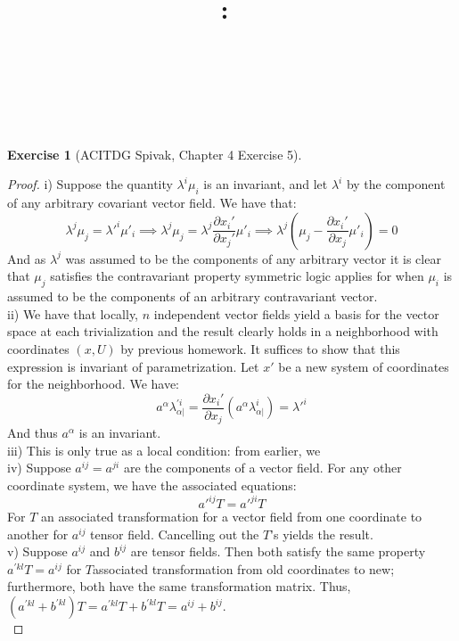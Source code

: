 \documentclass{article}
\title{
    \vspace{2in}
    \textmd{\textbf{\hmwkClass:\ \hmwkTitle}}\\
    \vspace{0.1in}
    \textmd{\hmwkDueDate} \\
    \vspace{0.2in}\large{\textit{\hmwkClassInstructor\  }}
    \vspace{2in}
}
\author{\hmwkAuthorName}
\date{}
\newtheorem{exercise}{Exercise}
\begin{document}
\maketitle

\newpage

\begin{exercise}[ACITDG Spivak, Chapter 4 Exercise 5]  
\end{exercise}
\begin{proof}
  i) Suppose the quantity $\lambda^{i}\mu_{i}$ is an invariant, and let $\lambda^{i}$ by the component of any arbitrary covariant vector field. We have that:
  \[
    \lambda^{j}\mu_{j} = \lambda '^{i}\mu '_{i} \implies \lambda^{j}\mu_{j} = \lambda^{j} \frac{\partial x_{i}'}{\partial x_{j}'}\mu '_{i} \implies \lambda^{j}\left(\mu_{j} -  \frac{\partial x_{i}'}{\partial x_{j}}\mu '_{i} \right) = 0
  \]
  And as $\lambda^{j}$ was assumed to be the components of any arbitrary vector it is clear that $\mu_{j}$ satisfies the contravariant property symmetric logic applies for when $\mu_{i}$ is assumed to be the components of an arbitrary contravariant vector. \\
  ii) We have that locally, $n$ independent vector fields yield a basis for the vector space at each trivialization and the result clearly holds in a neighborhood with coordinates $(x,U)$ by previous homework. It suffices to show that this expression is invariant of parametrization. Let $x'$ be a new system of coordinates for the neighborhood. We have:
  \[
    a^{\alpha}\lambda_{\alpha |}^{\prime i} = \frac{\partial x_{i}'}{\partial x_{j}}(a^{\alpha} \lambda^{i}_{\alpha |}) = \lambda '^{i}
  \]
  And thus $a^{\alpha}$ is an invariant. \\
  iii) This is only true as a local condition: from earlier, we \\
  iv) Suppose $a^{ij}=a^{ji}$ are the components of a vector field. For any other coordinate system, we have the associated equations:
  \[
    a'^{ij}T = a'^{ji}T 
  \]
  For $T$ an associated transformation for a vector field from one coordinate to another for $a^{ij}$ tensor field. Cancelling out the $T$'s yields the result. \\
  v) Suppose $a^{ij}$ and $b^{ij}$ are tensor fields. Then both satisfy the same property $a^{\prime kl}T = a^{ij}$ for $T$associated transformation from old coordinates to new; furthermore, both have the same transformation matrix. Thus, $(a^{\prime kl}+b^{\prime kl})T = a^{\prime kl}T + b^{\prime kl}T = a^{ij} + b^{ij}$. \\

\end{proof}
\end{document}
